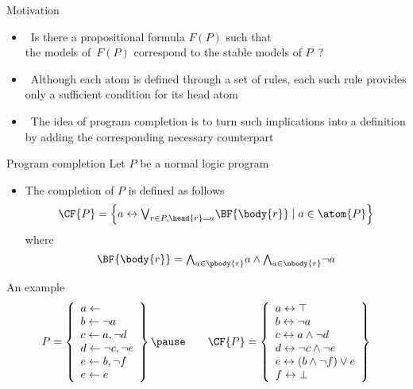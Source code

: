 \begin{frame}{Motivation}
  \bigskip
  \begin{itemize}
  \item<1->  \
    Is there a propositional formula $F(P)$ such that
    \\
    the models of~$F(P)$ correspond to the stable models of $P$~?
    \bigskip
  \item<2->  \
    Although each atom is defined through a set of rules,
    each such rule provides only a \alert{sufficient} condition for its head atom
    \medskip
  \item<3-> \structure{Clark's Idea} \
    The idea of program completion is to turn such implications into a definition
    by adding the corresponding \alert{necessary} counterpart
  \end{itemize}
\end{frame}
\begin{frame}{Program completion}
  \bigskip
  Let $P$ be a normal logic program
  \bigskip
  \begin{itemize}
  \item
    The \alert{completion}  of $P$ is defined as follows
    \[
    \CF{P}
    =
    \left\{a \leftrightarrow \textstyle{\bigvee_{r\in P, \head{r} = a}} \BF{\body{r}} \mid a\in\atom{P}\right\}
    \]
    where
    \[
    \BF{\body{r}}
    =
    \textstyle{\bigwedge_{a\in\pbody{r}}}      a
    \wedge
    \textstyle{\bigwedge_{a\in\nbody{r}}} \neg a
    \]
  \end{itemize}
\end{frame}
\begin{frame}{An example}
\[
P
=
\left\{
  \begin{array}{l}
    a \leftarrow                \\
    b \leftarrow \neg a         \\
    c \leftarrow a, \neg d      \\
    d \leftarrow \neg c, \neg e \\
    e \leftarrow b, \neg f      \\
    e \leftarrow e
  \end{array}
\right\}
\pause\qquad
\CF{P}
=
\left\{
  \begin{array}{l}
    a \leftrightarrow \top                    \\
    b \leftrightarrow \neg{a}                 \\
    c \leftrightarrow a\wedge \neg{d}         \\
    d \leftrightarrow \neg{c}\wedge \neg{e}   \\
    e \leftrightarrow (b\wedge \neg{f}) \vee e\\
    f \leftrightarrow \bot
  \end{array}
\right\}
\]
\end{frame}
